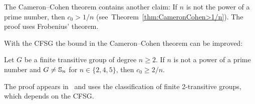 The Cameron--Cohen theorem contains another claim: If
$n$ is not the power of a prime number, then 
$c_0>1/n$ (see~Theorem~\ref{thm:CameronCohen>1/n}). The proof uses Frobenius' theorem. 

\begin{optional}
    
With the CFSG the bound in the 
Cameron--Cohen theorem can be improved:

\begin{theorem}
    Let $G$ be a finite transitive group of degree $n\geq2$. If $n$ 
    is not a power of a prime number and 
    $G\ne\mathbb{S}_n$ for $n\in\{2,4,5\}$, then $c_0\geq 2/n$.
\end{theorem}

The proof appears in~\cite{MR1484879} and uses
the classification of finite 2-transitive groups, 
which depends on the CFSG. 
\end{optional}



